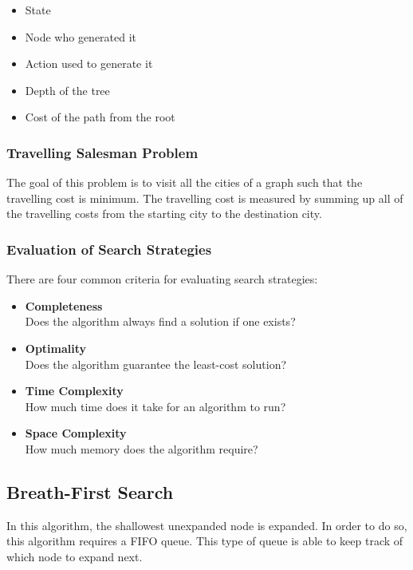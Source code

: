 \documentclass{article}
\begin{document}
\begin{itemize}
	\item State
	\item Node who generated it
	\item Action used to generate it
	\item Depth of the tree
	\item Cost of the path from the root
\end{itemize}

\subsubsection{Travelling Salesman Problem}
The goal of this problem is to visit all the cities of a graph such that the travelling cost is minimum. The travelling cost is measured by summing up all of the travelling costs from the starting city to the destination city.

\subsubsection{Evaluation of Search Strategies}
There are four common criteria for evaluating search strategies:

\begin{itemize}
	\item \textbf{Completeness}
	\vspace{.2cm} \\
	Does the algorithm always find a solution if one exists?
	
	\item \textbf{Optimality}
	\vspace{.2cm} \\
	Does the algorithm guarantee the least-cost solution?
	
	\item \textbf{Time Complexity}
	\vspace{.2cm} \\
	How much time does it take for an algorithm to run?
	
	\item \textbf{Space Complexity}
	\vspace{.2cm} \\
	How much memory does the algorithm require?
\end{itemize}

\subsection{Breath-First Search}
In this algorithm, the shallowest unexpanded node is expanded. In order to do so, this algorithm requires a FIFO queue. This type of queue is able to keep track of which node to expand next. \\
\end{document}
